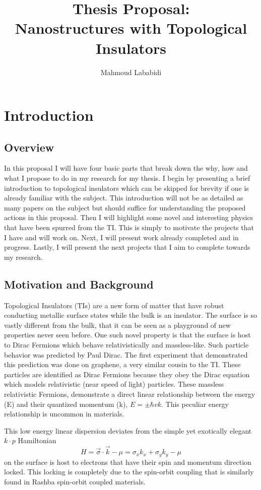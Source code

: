 \documentclass[11pt]{report}
\title{Thesis Proposal: \\Nanostructures with Topological Insulators}
\author{Mahmoud Lababidi}
\begin{document}
\maketitle
\tableofcontents

\chapter{Introduction}
\section{Overview}
In this proposal I will have four basic parts that break down the why, how and what I propose to do in my research for my thesis. I begin by presenting a brief introduction to topological insulators which can be skipped for brevity if one is already familiar with the subject. This introduction will not be as detailed as many papers on the subject but should suffice for understanding the proposed actions in this proposal. Then I will highlight some novel and interesting physics that have been spurred from the TI. This is simply to motivate the projects that I have and will work on. Next, I will present work already completed and in progress. Lastly, I will present the next projects that I aim to complete towards my research. 


\section{Motivation and Background}
Topological Insulators (TIs) are a new form of matter that have robust conducting metallic surface states while the bulk is an insulator. The surface is so vastly different from the bulk, that it can be seen as a playground of new properties never seen before. One such novel property is that the surface is host to Dirac Fermions which behave relativistically and massless-like. Such particle behavior was predicted by Paul Dirac. The first experiment that demonstrated this prediction was done on graphene, a very similar cousin to the TI. These particles are identified as  Dirac Fermions because they obey the Dirac equation which models relativistic (near speed of light) particles. These massless relativistic Fermions, demonstrate a direct linear relationship between the energy (E) and their quantized momentum (k), $E=\pm\hbar v k$. This peculiar energy relationship is uncommon in  materials. 

This low energy linear dispersion deviates from the simple yet exotically elegant  $k\cdot p$ Hamiltonian
\begin{equation}
H=\vec{\sigma}\cdot \vec{k}-\mu=\sigma_x k_x + \sigma_y k_y - \mu
\end{equation}
on the surface is host to electrons that have their spin and momentum direction locked. This locking is completely due to the spin-orbit coupling that is similarly found in Rashba spin-orbit coupled materials.
\end{document}
